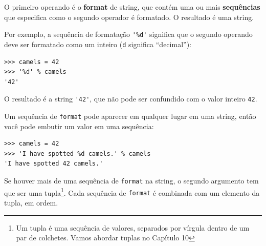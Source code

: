 {%


O primeiro operando é o {\bf format} de string, que contém uma ou mais
{\bf sequências} que especifica como o segundo operador é formatado. O
resultado é uma string.



Por exemplo, a sequência de formatação \verb"'%d'" significa que o segundo
operando deve ser formatado como um inteiro ({\tt d} significa ``decimal''):

\beforeverb
\begin{verbatim}
>>> camels = 42
>>> '%d' % camels
'42'
\end{verbatim}
\afterverb
%
%
O resultado é a string \verb"'42'", que não pode ser confundido com o valor
inteiro {\tt 42}.


Um sequência de {\tt format} pode aparecer em qualquer lugar em uma string,
então você pode embutir um valor em uma sequência:

\beforeverb
\begin{verbatim}
>>> camels = 42
>>> 'I have spotted %d camels.' % camels
'I have spotted 42 camels.'
\end{verbatim}
\afterverb
%
%
Se houver mais de uma sequência de {\tt format} na string, o segundo argumento
tem que ser uma tupla\footnote{Um tupla é uma sequência de valores, separados
	por vírgula dentro de um par de colchetes. Vamos abordar tuplas no
	Capítulo 10}. Cada sequência de {\tt format} é combinada com um elemento
da tupla, em ordem.


}
